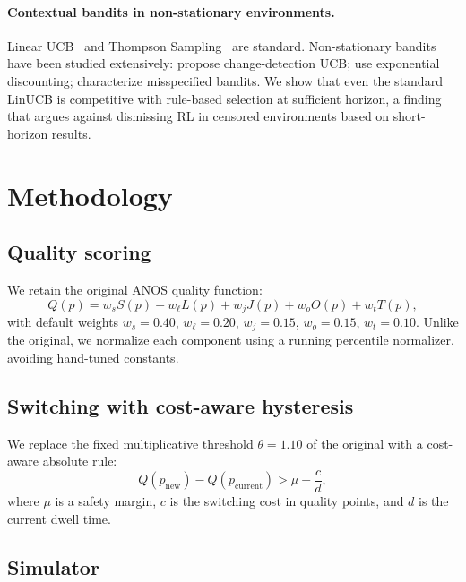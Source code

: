 \documentclass[11pt,a4paper]{article}
\begin{document}
\paragraph{Contextual bandits in non-stationary environments.}
Linear UCB~\citep{li2010contextual} and Thompson
Sampling~\citep{agrawal2012analysis} are standard. Non-stationary
bandits have been studied extensively: \citet{besbes2014stochastic}
propose change-detection UCB; \citet{russac2019weighted} use
exponential discounting; \citet{cheung2019learning} characterize
misspecified bandits. We show that even the standard LinUCB is
competitive with rule-based selection at sufficient horizon, a
finding that argues against dismissing RL in censored environments
based on short-horizon results.

\section{Methodology}
\label{sec:method}

\subsection{Quality scoring}

We retain the original ANOS quality function:
\begin{equation}
Q(p) = w_s S(p) + w_\ell L(p) + w_j J(p) + w_o O(p) + w_t T(p),
\end{equation}
with default weights $w_s = 0.40$, $w_\ell = 0.20$, $w_j = 0.15$,
$w_o = 0.15$, $w_t = 0.10$. Unlike the original, we normalize each
component using a running percentile normalizer, avoiding hand-tuned
constants.

\subsection{Switching with cost-aware hysteresis}

We replace the fixed multiplicative threshold $\theta = 1.10$ of the
original with a cost-aware absolute rule:
\begin{equation}
Q(p_{\text{new}}) - Q(p_{\text{current}}) > \mu + \frac{c}{d},
\end{equation}
where $\mu$ is a safety margin, $c$ is the switching cost in quality
points, and $d$ is the current dwell time.

\subsection{Simulator}
\end{document}
